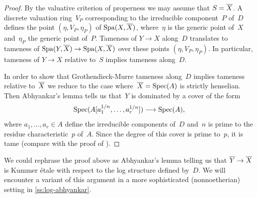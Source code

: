 \begin{proof}
    By the valuative criterion of properness we may assume that $S = \overline{X}$.
    A discrete valuation ring~$V_P$ corresponding to the irreducible component~$P$ of~$D$ defines the point $(\eta,V_P,\eta_P)$ of $\operatorname{Spa}(X,\overline{X})$, where~$\eta$ is the generic point of~$X$ and~$\eta_P$ the generic point of~$P$.
    Tameness of $Y \to X$ along~$D$ translates to tameness of $\operatorname{Spa}(Y,\overline{X}) \to \operatorname{Spa}(X,\overline{X})$ over these points $(\eta,V_P,\eta_P)$.
    In particular, tameness of $Y \to X$ relative to~$S$ implies tameness along~$D$.

    In order to show that Grothendieck-Murre tameness along~$D$ implies tameness relative to~$\overline{X}$ we reduce to the case where~$\overline{X} = \operatorname{Spec}(A)$ is strictly henselian.
    Then Abhyankar's lemma \cite[XIII Proposition~5.2]{SGA1} tells us that~$Y$ is dominated by a cover of the form
    \[
     \operatorname{Spec}(A[a_1^{1/n},\ldots,a_r^{1/n}]) \longrightarrow \operatorname{Spec}(A),
    \]
    where $a_1,\ldots,a_r \in A$ define the irreducible components of~$D$ and~$n$ is prime to the residue characteristic~$p$ of~$A$.
    Since the degree of this cover is prime to~$p$, it is tame (compare with the proof of \cite[Proposition~4.2]{KerzSchmidt2010:DifferentNotionsTameness}).
\end{proof}

We could rephrase the proof above as Abhyankar's lemma telling us that $\overline{Y} \to \overline{X}$ is Kummer étale with respect to the log structure defined by~$D$.
We will encounter a variant of this argument in a more sophisticated (nonnoetherian) setting in \cref{ss:log-abhyankar}.


